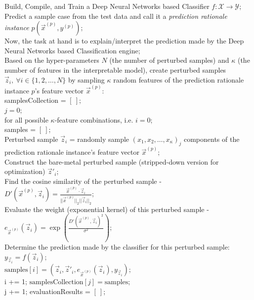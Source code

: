 \documentclass{article}
\begin{document}
\begin{algorithm}[H]
\SetAlgoLined
Build, Compile, and Train a Deep Neural Networks based Classifier $f: \mathcal{X} \rightarrow \mathcal{Y}$;\\
Predict a sample case from the test data and call it a \textit{prediction rationale instance} $p(\vec{x}^{(p)}, y^{(p)})$;\\
Now, the task at hand is to explain/interpret the prediction made by the Deep Neural Networks based Classification engine;\\
Based on the hyper-parameters $N$ (the number of perturbed samples) and $\kappa$ (the number of features in the interpretable model), create perturbed samples $\vec{z}_i,\ \forall i \in \{1, 2, \dots, N\}$ by sampling $\kappa$ random features of the prediction rationale instance $p$'s feature vector $\vec{x}^{(p)}$:\\
samplesCollection = $[\ ]$;\\
$j = 0$;\\
for all possible $\kappa$-feature combinations, i.e. 
{
    $i = 0$;\\
    samples = $[\ ]$;\\
    {
        Perturbed sample $\vec{z}_i$ = randomly sample $(x_1, x_2, \dots, x_{\kappa})_j$ components of the prediction rationale instance's feature vector $\vec{x}^{(p)}$;\\
        Construct the bare-metal perturbed sample (stripped-down version for optimization) $\vec{z}'_i$;\\
        Find the cosine similarity of the perturbed sample - \\
        $D'(\vec{x}^{(p)}, \vec{z}_i) = \frac{\vec{x}^{(p)} \cdot \vec{z}_i}{||\vec{x}^{(p)}||_2 ||\vec{z}_i||_2}$;\\
        Evaluate the weight (exponential kernel) of this perturbed sample - \\
        $e_{\vec{x}^{(p)}}(\vec{z}_i) = \exp({\frac{D'(\vec{x}^{(p)}, \vec{z}_i)^2}{\sigma^2}})$;\\
        Determine the prediction made by the classifier for this perturbed sample: $y_{\vec{z}_i} = f(\vec{z}_i)$;\\
        $\text{samples}[i] = (\vec{z}_i, \vec{z}'_i, e_{\vec{x}^{(p)}}(\vec{z}_i), y_{\vec{z}_i})$;\\
        i += 1;
    }
    $\text{samplesCollection}[j] = \text{samples}$;\\
    j += 1;
}
evaluationResults = $[\ ]$;\\

\end{algorithm}
\end{document}
